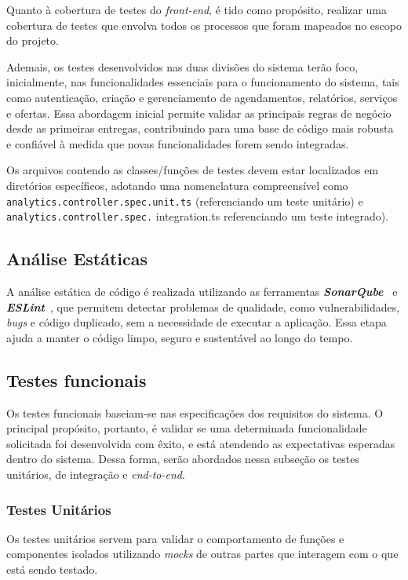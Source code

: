 Quanto à cobertura de testes do \textit{front-end}, é tido como propósito, realizar uma cobertura de testes que envolva todos os processos que foram mapeados no escopo do projeto.

Ademais, os testes desenvolvidos nas duas divisões do sistema terão foco, inicialmente, nas funcionalidades essenciais para o funcionamento do sistema, tais como autenticação, criação e gerenciamento de agendamentos, relatórios, serviços e ofertas. Essa abordagem inicial permite validar as principais regras de negócio desde as primeiras entregas, contribuindo para uma base de código mais robusta e confiável à medida que novas funcionalidades forem sendo integradas.

Os arquivos contendo as classes/funções de testes devem estar localizados em diretórios específicos, adotando uma nomenclatura compreensível como 
\texttt{analytics.\allowbreak controller.\allowbreak spec.\allowbreak unit.ts} (referenciando um teste unitário) e \texttt{analytics.controller.spec.}%
\linebreak%
{\ttfamily integration.ts} referenciando um teste integrado).

\subsection{Análise Estáticas}
A análise estática de código é realizada utilizando as ferramentas \textbf{\textit{SonarQube}}~\cite{sonarqube-2025} e \textbf{\textit{ESLint}}~\cite{eslint-2025}, 
que permitem detectar problemas de qualidade, como vulnerabilidades, \textit{bugs} e código duplicado, sem a necessidade de executar a aplicação. Essa etapa ajuda a manter o código limpo, seguro e sustentável ao longo do tempo.

\subsection{Testes funcionais}
Os testes funcionais baseiam-se nas especificações dos requisitos do sistema. O principal propósito, portanto, é validar se uma determinada funcionalidade solicitada foi desenvolvida com êxito, e está atendendo as expectativas esperadas dentro do sistema. Dessa forma, serão abordados nessa subseção os testes unitários, de integração e \textit{end-to-end}. 

\subsubsection{Testes Unitários}
Os testes unitários servem para validar o comportamento de funções e componentes isolados utilizando \textit{mocks} de outras partes que interagem com o que está sendo testado.

